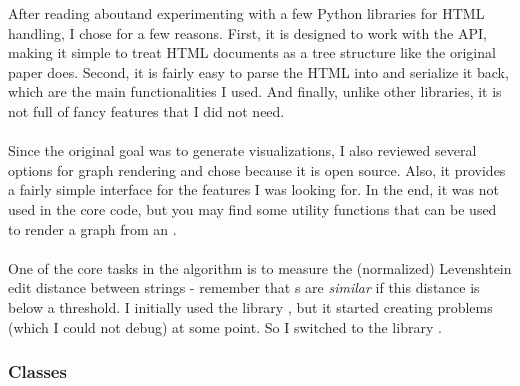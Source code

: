 \documentclass[10pt]{article}
\newcommand{\gn}{\path{GNode}}
\begin{document}
After reading about\footnotemark and experimenting with a few Python libraries for HTML handling, I chose  for a few reasons. First, it is designed to work with the  API, making it simple to treat HTML documents as a tree structure like the original paper does. Second, it is fairly easy to parse the HTML into  and serialize it back, which are the main functionalities I used. And finally, unlike other libraries, it is not full of fancy features that I did not need.


\paragraph{} Since the original goal was to generate visualizations, I also reviewed several options for graph rendering and chose  because it is open source. Also, it provides a fairly simple interface for the features I was looking for. In the end, it was not used in the core code, but you may find some utility functions that can be used to render a graph from an .

\paragraph{} One of the core tasks in the algorithm is to measure the (normalized) Levenshtein edit distance between strings - remember that \gn{}s are \emph{similar} if this distance is below a threshold. I initially used the library \footnotemark, but it started creating problems (which I could not debug) at some point. So I switched to the library \footnotemark.





\subsubsection{Classes} \label{txt:classes}

\paragraph{\gn{}}
\end{document}
